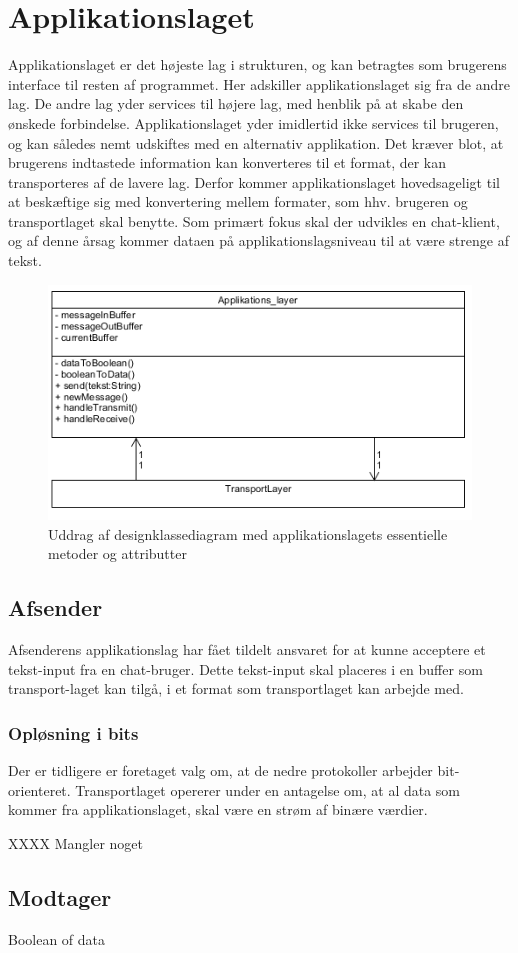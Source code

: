\section{Applikationslaget}
Applikationslaget er det højeste lag i strukturen, og kan betragtes som brugerens interface til resten af programmet. Her adskiller applikationslaget sig fra de andre lag. De andre lag yder services til højere lag, med henblik på at skabe den ønskede forbindelse. Applikationslaget yder imidlertid ikke services til brugeren, og kan således nemt udskiftes med en alternativ applikation. Det kræver blot, at brugerens indtastede information kan konverteres til et format, der kan transporteres af de lavere lag.
	Derfor kommer applikationslaget hovedsageligt til at beskæftige sig med konvertering mellem formater, som hhv. brugeren og transportlaget skal benytte. Som primært fokus skal der udvikles en chat-klient, og af denne årsag kommer dataen på applikationslagsniveau til at være strenge af tekst.
	
	
\begin{figure}[h]
\centering
\includegraphics[scale=0.6]{Billeder/ApplicationLayerDesignClass.PNG}
\caption{Uddrag af designklassediagram med applikationslagets essentielle metoder og attributter}
\label{fig:AppLayerDesign}
\end{figure}
	
\subsection{Afsender}
Afsenderens applikationslag har fået tildelt ansvaret for at kunne acceptere et tekst-input fra en chat-bruger. Dette tekst-input skal placeres i en buffer som transport-laget kan tilgå, i et format som transportlaget kan arbejde med. 

\subsubsection{Opløsning i bits}
Der er tidligere er foretaget valg om, at de nedre protokoller arbejder bit-orienteret. Transportlaget opererer under en antagelse om, at al data som kommer fra applikationslaget, skal være en strøm af binære værdier.

XXXX Mangler noget

\subsection{Modtager}
Boolean of data